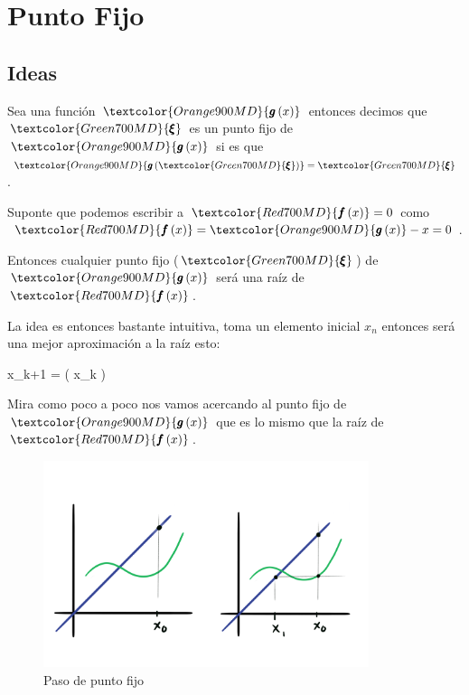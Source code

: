 \documentclass[12pt, fleqn]{report}                             %
\def \Eq {equation}                                             %
\newenvironment{MultiLineEquation*}[1]                          %
        {\begin{\Eq*}\begin{alignedat}{#1}}                         %
        {\end{alignedat}\end{\Eq*}}                                 %
\newenvironment{LargeEq} {\begingroup \Large}{\endgroup}        %
\theoremstyle{break}                                            %
\newcommand{\Wrap}[1]           {\left( #1 \right)}             %
\newcommand{\Color}[2]{\textcolor{#1}{#2}}                      %
\newcommand \ColorFun          {Red700MD}                       %
\newcommand \ColorFunG         {Orange900MD}                    %
\newcommand \ColorRoot         {Green700MD}                     %
\newcommand \ColorVarX         {Purple300MD}                    %
\newcommand \ColorVarXpu       {Purple700MD}                    %
\newcommand \Fun[1]      {\Color{\ColorFun}{\pmb{f}\Wrap{#1}}}          %
\newcommand \FunG[1]     {\Color{\ColorFunG}{\pmb{g}\Wrap{#1}}}         %
\newcommand \Root        {\Color{\ColorRoot}{\pmb{\xi} }}               %
\newcommand \VarX        {\Color{\ColorVarX}{x_k }}                     %
\newcommand \VarXpu      {\Color{\ColorVarXpu}{x_{k+1}  }}              %
\begin{document}
    \chapter{Punto Fijo}

        \clearpage
        \section{Ideas}

            Sea una función $\FunG{x}$ entonces decimos que $\Root$ es un punto fijo de $\FunG{x}$ si 
            es que $\FunG{\Root} = \Root$.

            Suponte que podemos escribir a $\Fun{x} = 0$ como 
            $\Fun{x} = \FunG{x} - x = 0$.

            Entonces cualquier punto fijo ($\Root$) de $\FunG{x}$ será una raíz de $\Fun{x}$.

            La idea es entonces bastante intuitiva, toma un elemento inicial $x_n$ entonces
            será una mejor aproximación a la raíz esto:
            \begin{LargeEq}
                \begin{MultiLineEquation*}{3}
                    \VarXpu = \FunG{\VarX}
                \end{MultiLineEquation*}
            \end{LargeEq}

            Mira como poco a poco nos vamos acercando al punto fijo de $\FunG{x}$ que es lo
            mismo que la raíz de $\Fun{x}$.
            \begin{figure}[h]
                \centering
                \includegraphics[width=0.85\textwidth]{FixedPoint}
                \caption{Paso de punto fijo}
            \end{figure}
\end{document}

